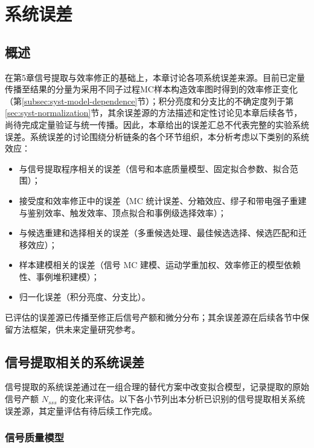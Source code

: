 \chapter{系统误差}
\label{chap:systematics}

\section{概述}
\label{sec:syst-overview}

在第5章信号提取与效率修正的基础上，本章讨论各项系统误差来源。目前已定量传播至结果的分量为采用不同子过程MC样本构造效率图时得到的效率修正变化（第\ref{subsec:syst-model-dependence}节）；积分亮度和分支比的不确定度列于第\ref{sec:syst-normalization}节，其余误差源的方法描述和定性讨论见本章后续各节，尚待完成定量验证与统一传播。因此，本章给出的误差汇总不代表完整的实验系统误差。系统误差的讨论围绕分析链条的各个环节组织，本分析考虑以下类别的系统效应：

\begin{itemize}
  \item 与信号提取程序相关的误差（信号和本底质量模型、固定拟合参数、拟合范围）；
  \item 接受度和效率修正中的误差（MC 统计误差、分箱效应、缪子和带电强子重建与鉴别效率、触发效率、顶点拟合和事例级选择效率）；
  \item 与候选重建和选择相关的误差（多重候选处理、最佳候选选择、候选匹配和迁移效应）；
  \item 样本建模相关的误差（信号 MC 建模、运动学重加权、效率修正的模型依赖性、事例堆积建模）；
  \item 归一化误差（积分亮度、分支比）。
\end{itemize}

已评估的误差源已传播至修正后信号产额和微分分布；其余误差源在后续各节中保留方法框架，供未来定量研究参考。

\section{信号提取相关的系统误差}
\label{sec:syst-signal-extraction}

信号提取的系统误差通过在一组合理的替代方案中改变拟合模型，记录提取的原始信号产额 $N_{sss}$ 的变化来评估。以下各小节列出本分析已识别的信号提取相关系统误差源，其定量评估有待后续工作完成。

\subsection{信号质量模型}
\label{subsec:syst-signal-model}

